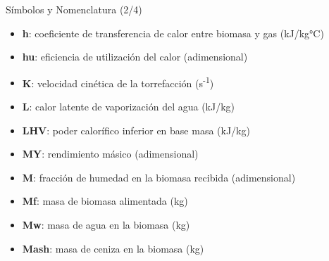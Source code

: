 \documentclass[main.tex]{subfiles}
\begin{document}
\begin{frame}{Símbolos y Nomenclatura (2/4)}
\footnotesize
\begin{itemize}
  \item \textbf{h}: coeficiente de transferencia de calor entre biomasa y gas (kJ/kg°C)
  \item \textbf{hu}: eficiencia de utilización del calor (adimensional)
  \item \textbf{K}: velocidad cinética de la torrefacción (s\textsuperscript{-1})
  \item \textbf{L}: calor latente de vaporización del agua (kJ/kg)
  \item \textbf{LHV}: poder calorífico inferior en base masa (kJ/kg)
  \item \textbf{MY}: rendimiento másico (adimensional)
  \item \textbf{M}: fracción de humedad en la biomasa recibida (adimensional)
  \item \textbf{Mf}: masa de biomasa alimentada (kg)
  \item \textbf{Mw}: masa de agua en la biomasa (kg)
  \item \textbf{Mash}: masa de ceniza en la biomasa (kg)
\end{itemize}
\end{frame}
\end{document}
